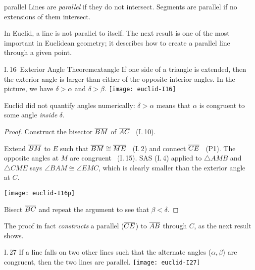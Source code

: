 \goodbreak



\begin{defn}{}{parallel}
	Lines are \emph{parallel} if they do not intersect. Segments are parallel if no extensions of them intersect.
\end{defn}

In Euclid, a line is not parallel to itself. The next result is one of the most important in Euclidean geometry; it describes how to create a parallel line through a given point.


\begin{thm}[lower separated=false, sidebyside, sidebyside align=top seam, sidebyside gap=0pt, righthand width=0.37\linewidth]{I.\,16\ Exterior Angle Theorem}{extangle}
	If one side of a triangle is extended, then the exterior angle is larger than either of the opposite interior angles.\smallbreak
	In the picture, we have $\delta>\alpha$ and $\delta>\beta$.
	\tcblower
	\flushright\texttt{[image: euclid-I16]}
\end{thm}

Euclid did not quantify angles numerically: $\delta>\alpha$ means that $\alpha$ is congruent to some angle \emph{inside} $\delta$.

\begin{proof}
	Construct the bisector $\overline{BM}$ of $\overline{AC}$ \ (I.\,10).\par
	\begin{minipage}[t]{0.64\linewidth}\vspace{-5pt}
		Extend $\overline{BM}$ to $E$ such that $\overline{BM}\cong\overline{ME}$ \  (I.\,2) and connect $\overline{CE}$ \  (P1).\smallbreak
		The opposite angles at $M$ are congruent \ (I.\,15).\smallbreak
		SAS (I.\,4) applied to $\triangle AMB$ and $\triangle CME$ says $\angle BAM\cong\angle EMC$, which is clearly smaller than the exterior angle at $C$.
	\end{minipage}
	\hfill
	\begin{minipage}[t]{0.35\linewidth}\vspace{-20pt}
		\flushright\texttt{[image: euclid-I16p]}
	\end{minipage}
	\smallbreak
	Bisect $\overline{BC}$ and repeat the argument to see that $\beta<\delta$.
\end{proof}

The proof in fact \emph{constructs} a parallel ($\overline{CE}$) to $\overline{AB}$ through $C$, as the next result shows.

\begin{thm}[lower separated=false, sidebyside, sidebyside align=top seam, sidebyside gap=0pt, righthand width=0.32\linewidth]{I.\,27}{}
	If a line falls on two other lines such that the alternate angles ($\alpha,\beta$) are congruent, then the two lines are parallel.
	\tcblower
	\flushright\texttt{[image: euclid-I27]}
\end{thm}

